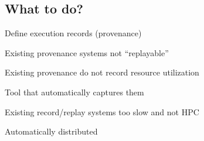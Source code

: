 \documentclass[a1paper]{article}
\begin{document}
{\begin{multicols}{3}
    \columnbreak
        
        \section{What to do?}
        \begin{compactitem}
            \item Define execution records (provenance)
            \begin{compactitem}
                \item Existing provenance systems not ``replayable''
                \item Existing provenance do not record resource utilization
            \end{compactitem}
            \item Tool that automatically captures them
            \begin{compactitem}
                \item Existing record/replay systems too slow and not HPC
            \end{compactitem}
            \item Automatically distributed
        \end{compactitem}

    \end{multicols}

}



 
\end{document}
